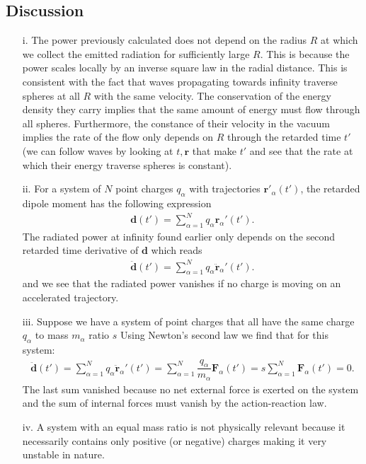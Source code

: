 \documentclass[10pt, a4paper]{article}
\begin{document}
{\subsection{Discussion}
\begin{enumerate}
    \item[i.] The power previously calculated does not depend on the radius $R$ at which we collect the emitted radiation for sufficiently large $R$. This is because the power scales locally by an inverse square law in the radial distance. This is consistent with the fact that waves propagating towards infinity traverse spheres at all $R$ with the same velocity. The conservation of the energy density they carry implies that the same amount of energy must flow through all spheres. Furthermore, the constance of their velocity in the vacuum implies the rate of the flow only depends on $R$ through the retarded time $t'$ (we can follow waves by looking at $t, \mathbf{r}$ that make $t'$ and see that the rate at which their energy traverse spheres is constant). 
    \item[ii.] For a system of $N$ point charges $q_\alpha$ with trajectories $\mathbf{r}'_\alpha(t')$, the retarded dipole moment has the following expression 
    \begin{align*}
        \mathbf{d}(t') = \sum_{\alpha=1}^N q_\alpha \mathbf{r}_\alpha'(t').  
    \end{align*}
    The radiated power at infinity found earlier only depends on the second retarded time derivative of $\mathbf{d}$ which reads 
    \begin{align*}
        \ddot{\mathbf{d}}(t') = \sum_{\alpha=1}^N q_\alpha \ddot{\mathbf{r}}_\alpha'(t').  
    \end{align*}
    and we see that the radiated power vanishes if no charge is moving on an accelerated trajectory. 
    \item[iii.] Suppose we have a system of point charges that all have the same charge $q_\alpha$ to mass $m_\alpha$ ratio $s$ Using Newton's second law we find that for this system: 
    \begin{align*}
        \ddot{\mathbf{d}}(t') = \sum_{\alpha=1}^N q_\alpha \ddot{\mathbf{r}}_\alpha'(t') = \sum_{\alpha=1}^N \dfrac{q_\alpha}{m_\alpha} \mathbf{F}_\alpha(t') = s \sum_{\alpha=1}^N \mathbf{F}_\alpha(t') = 0.  
    \end{align*}
    The last sum vanished because no net external force is exerted on the system and the sum of internal forces must vanish by the action-reaction law.
    \item[iv.] A system with an equal mass ratio is not physically relevant because it necessarily contains only positive (or negative) charges making it very unstable in nature. 
\end{enumerate}
\newpage

}
\end{document}
